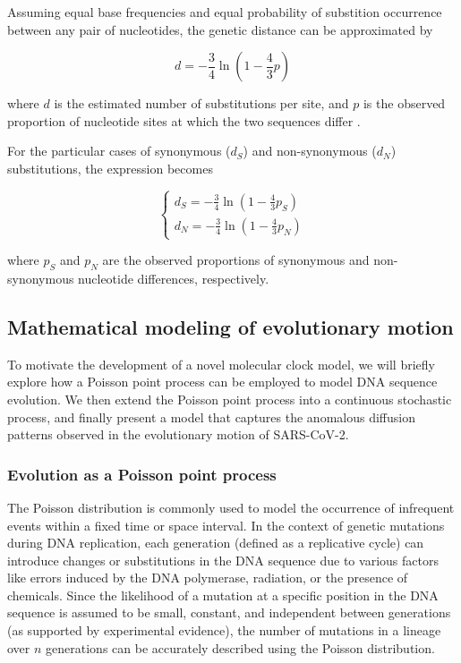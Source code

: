 \begin{definition}
    Assuming equal base frequencies and equal probability of substition occurrence between any pair of nucleotides, the genetic distance can be approximated by

    $$
    d = -\frac{3}{4} \ln{\left(1 - \frac{4}{3}p\right)}
    $$

    where \(d\) is the estimated number of substitutions per site, and \(p\) is the observed proportion of nucleotide sites at which the two sequences differ \cite{jukes1969}.

    For the particular cases of synonymous (\(d_S\)) and non-synonymous (\(d_N\)) substitutions, the expression becomes

    $$
    \begin{cases}
        d_S = -\frac{3}{4} \ln{\left(1 - \frac{4}{3}p_S\right)}\\
        d_N = -\frac{3}{4} \ln{\left(1 - \frac{4}{3}p_N\right)}
    \end{cases}
    $$

    where \(p_S\) and \(p_N\) are the observed proportions of synonymous and non-synonymous nucleotide differences, respectively.
\end{definition}



\subsection{Mathematical modeling of evolutionary motion}

To motivate the development of a novel molecular clock model, we will briefly explore how a Poisson point process can be employed to model DNA sequence evolution. We then extend the Poisson point process into a continuous stochastic process, and finally present a model that captures the anomalous diffusion patterns observed in the evolutionary motion of SARS-CoV-2.

\subsubsection{Evolution as a Poisson point process}

The Poisson distribution is commonly used to model the occurrence of infrequent events within a fixed time or space interval. In the context of genetic mutations during DNA replication, each generation (defined as a replicative cycle) can introduce changes or substitutions in the DNA sequence due to various factors like errors induced by the DNA polymerase, radiation, or the presence of chemicals. Since the likelihood of a mutation at a specific position in the DNA sequence is assumed to be small, constant, and independent between generations (as supported by experimental evidence), the number of mutations in a lineage over $n$ generations can be accurately described using the Poisson distribution.



